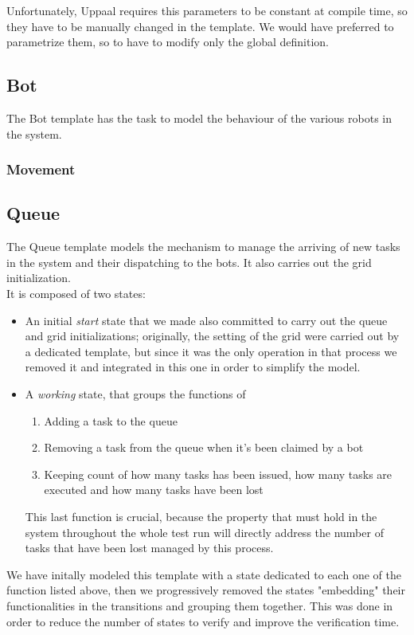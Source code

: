 \documentclass[10pt,a4paper]{article}
\begin{document}
			Unfortunately, Uppaal requires this parameters to be constant at compile time, so they have to be manually changed in the template. We would have preferred to parametrize them, so to have to modify only the global definition. 
			
		
		\subsection{Bot}
			The Bot template has the task to model the behaviour of the various robots in the system. 
			\subsubsection{Movement}
		
		\subsection{Queue}
			The Queue template models the mechanism to manage the arriving of new tasks in the system and their dispatching to the bots. It also carries out the grid initialization.\\
			It is composed of two states:
			\begin{itemize}
				\item An initial \emph{start} state that we made also committed to carry out the queue and grid initializations; originally, the setting of the grid were carried out by a dedicated template, but since it was the only operation in that process we removed it and integrated in this one in order to simplify the model.
				\item A \emph{working} state, that groups the functions of
					\begin{enumerate}
						\item Adding a task to the queue
						\item Removing a task from the queue when it's been claimed by a bot
						\item Keeping count of how many tasks has been issued, how many tasks are executed and how many tasks have been lost
					\end{enumerate}
					This last function is crucial, because the property that must hold in the system throughout the whole test run will directly address the number of tasks that have been lost managed by this process.
			\end{itemize}
			We have initally modeled this template with a state dedicated to each one of the function listed above, then we progressively removed the states "embedding" their functionalities in the transitions and grouping them together. This was done in order to reduce the number of states to verify and improve the verification time. 
		
\end{document}
